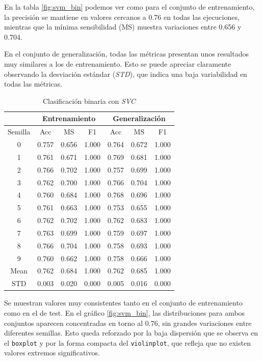 En la tabla \ref{fig:svm_bin} podemos ver como para el conjunto de entrenamiento, la precisión se mantiene en valores cercanos a 0.76 en todas las ejecuciones, mientras que la mínima sensibilidad (MS) muestra variaciones entre 0.656 y 0.704.

\vspace{1em}

En el conjunto de generalización, todas las métricas presentan unos resultados muy similares a los de entrenamiento. Esto se puede apreciar claramente observando la desviación estándar (\textit{STD}), que indica una baja variabilidad en todas las métricas.

\begin{table}[H]
	\centering
	\begin{tabular}{ |c|c|c|c|c|c|c| }
		\hline
		\rowcolor{LightCyan}
		 & \multicolumn{3}{c|}{Entrenamiento} & \multicolumn{3}{c|}{Generalización} \\
		\hline
		\rowcolor{LightCyan}
		 Semilla & Acc & MS & F1 & Acc & MS & F1 \\
		\hline
		0 & 0.757 & 0.656 & 1.000 & 0.764 & 0.672 & 1.000 \\
		1 & 0.761 & 0.671 & 1.000 & 0.769 & 0.681 & 1.000 \\
		2 & 0.766 & 0.702 & 1.000 & 0.757 & 0.699 & 1.000 \\
		3 & 0.762 & 0.700 & 1.000 & 0.766 & 0.704 & 1.000 \\
		4 & 0.760 & 0.684 & 1.000 & 0.768 & 0.696 & 1.000 \\
		5 & 0.761 & 0.663 & 1.000 & 0.753 & 0.655 & 1.000 \\
		6 & 0.762 & 0.702 & 1.000 & 0.762 & 0.683 & 1.000 \\
		7 & 0.763 & 0.699 & 1.000 & 0.759 & 0.697 & 1.000 \\
		8 & 0.766 & 0.704 & 1.000 & 0.758 & 0.693 & 1.000 \\
		9 & 0.760 & 0.662 & 1.000 & 0.758 & 0.666 & 1.000 \\
		Mean & 0.762 & 0.684 & 1.000 & 0.762 & 0.685 & 1.000 \\
		STD & 0.003 & 0.020 & 0.000 & 0.005 & 0.016 & 0.000 \\
		\hline
	\end{tabular}
	\caption{Clasificación binaria con \textit{SVC}}
	\label{tabla:svm_bin}
\end{table}

Se muestran valores muy consistentes tanto en el conjunto de entrenamiento como en el de test. En el gráfico \ref{fig:svm_bin}, las distribuciones para ambos conjuntos aparecen concentradas en torno al 0.76, sin grandes variaciones entre diferentes semillas. Esto queda reforzado por la baja dispersión que se observa en el \texttt{boxplot} y por la forma compacta del \texttt{violinplot}, que refleja que no existen valores extremos significativos.

